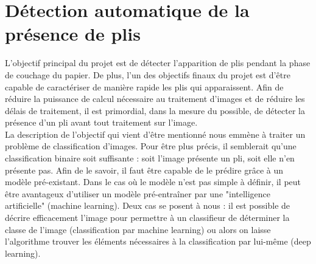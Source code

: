 \documentclass[a4paper, 11pt]{article}
\begin{document}
	\section{Détection automatique de la présence de plis}
		\label{annexe:sift}
		L'objectif principal du projet est de détecter l'apparition de plis pendant la phase de couchage du papier. De plus, l'un des objectifs finaux du projet est d'être capable de caractériser de manière rapide les plis qui apparaissent. Afin de réduire la puissance de calcul nécessaire au traitement d'images et de réduire les délais de traitement, il est primordial, dans la mesure du possible, de détecter la présence d'un pli avant tout traitement sur l'image.
		\\La description de l'objectif qui vient d'être mentionné nous emmène à traiter un problème de classification d'images. Pour être plus précis, il semblerait qu'une classification binaire soit suffisante : soit l'image présente un pli, soit elle n'en présente pas. Afin de le savoir, il faut être capable de le prédire grâce à un modèle pré-existant. Dans le cas où le modèle n'est pas simple à définir, il peut être avantageux d'utiliser un modèle pré-entraîner par une "intelligence artificielle" (machine learning). Deux cas se posent à nous : il est possible de décrire efficacement l'image pour permettre à un classifieur de déterminer la classe de l'image (classification par machine learning) ou alors on laisse l'algorithme trouver les éléments nécessaires à la classification par lui-même (deep learning).
\end{document}
